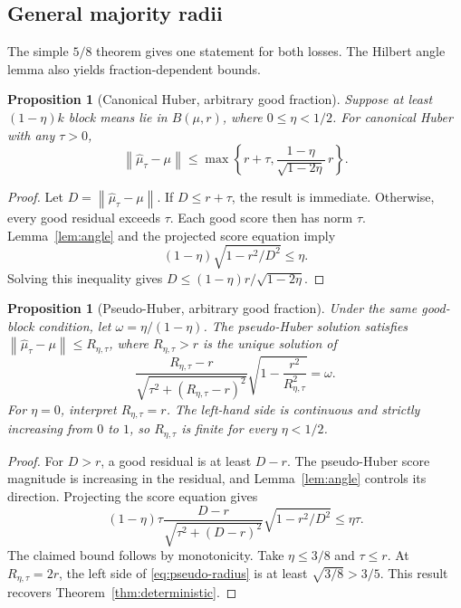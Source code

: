 \documentclass[twoside]{article}
\newtheorem{proposition}[theorem]{Proposition}
\theoremstyle{definition}
\newcommand{\norm}[1]{\left\lVert #1\right\rVert}
\begin{document}
\subsection{General majority radii}\label{app:general-majority}

The simple $5/8$ theorem gives one statement for both losses. The Hilbert angle lemma also yields fraction-dependent bounds.

\begin{proposition}[Canonical Huber, arbitrary good fraction]\label{prop:canonical-general}
Suppose at least $(1-\eta)k$ block means lie in $B(\mu,r)$, where $0\le\eta<1/2$. For canonical Huber with any $\tau>0$,
\[
    \norm{\hat\mu_\tau-\mu}
    \le
    \max\left\{r+\tau,
    \frac{1-\eta}{\sqrt{1-2\eta}}\,r\right\}.
\]
\end{proposition}

\begin{proof}
Let $D=\norm{\hat\mu_\tau-\mu}$. If $D\le r+\tau$, the result is immediate. Otherwise, every good residual exceeds $\tau$. Each good score then has norm $\tau$. Lemma~\ref{lem:angle} and the projected score equation imply
\[
    (1-\eta)\sqrt{1-r^2/D^2}\le\eta.
\]
Solving this inequality gives $D\le(1-\eta)r/\sqrt{1-2\eta}$.
\end{proof}

\begin{proposition}[Pseudo-Huber, arbitrary good fraction]\label{prop:pseudo-general}
Under the same good-block condition, let $\omega=\eta/(1-\eta)$. The pseudo-Huber solution satisfies $\norm{\hat\mu_\tau-\mu}\le R_{\eta,\tau}$, where $R_{\eta,\tau}>r$ is the unique solution of
\begin{equation}\label{eq:pseudo-radius}
    \frac{R_{\eta,\tau}-r}{\sqrt{\tau^2+(R_{\eta,\tau}-r)^2}}
    \sqrt{1-\frac{r^2}{R_{\eta,\tau}^2}}=\omega.
\end{equation}
For $\eta=0$, interpret $R_{\eta,\tau}=r$. The left-hand side is continuous and strictly increasing from $0$ to $1$, so $R_{\eta,\tau}$ is finite for every $\eta<1/2$.
\end{proposition}

\begin{proof}
For $D>r$, a good residual is at least $D-r$. The pseudo-Huber score magnitude is increasing in the residual, and Lemma~\ref{lem:angle} controls its direction. Projecting the score equation gives
\[
    (1-\eta)\tau
    \frac{D-r}{\sqrt{\tau^2+(D-r)^2}}
    \sqrt{1-r^2/D^2}
    \le\eta\tau.
\]
The claimed bound follows by monotonicity. Take $\eta\le3/8$ and $\tau\le r$. At $R_{\eta,\tau}=2r$, the left side of \eqref{eq:pseudo-radius} is at least $\sqrt{3/8}>3/5$. This result recovers Theorem~\ref{thm:deterministic}.
\end{proof}
\end{document}
